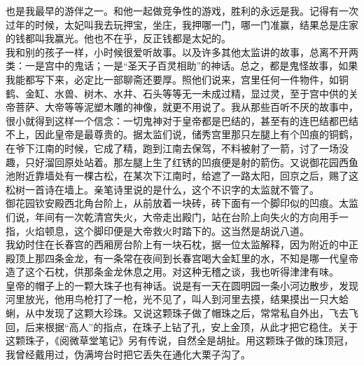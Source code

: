也是我最早的游伴之一。和他一起做竞争性的游戏，胜利的永远是我。记得有一次过年的时候，太妃叫我去玩押宝，坐庄，我押哪一门，哪一门准赢，结果总是庄家的钱都叫我赢光。他也不在乎，反正钱都是太妃的。\\

我和别的孩子一样，小时候很爱听故事。以及许多其他太监讲的故事，总离不开两类：一是宫中的鬼话；一是“圣天子百灵相助”的神话。总之，都是鬼怪故事，如果我能都写下来，必定比一部聊斋还要厚。照他们说来，宫里任何一件物件，如铜鹤、金缸、水兽、树木、水井、石头等等无一未成过精，显过灵，至于宫中供的关帝菩萨、大帝等等泥塑木雕的神像，就更不用说了。我从那些百听不厌的故事中，很小就得到这样一个信念：一切鬼神对于皇帝都是巴结的，甚至有的连巴结都巴结不上，因此皇帝是最尊贵的。据太监们说，储秀宫里那只左腿上有个凹痕的铜鹤，在爷下江南的时候，它成了精，跑到江南去保驾，不料被射了一箭，讨了一场没趣，只好溜回原处站着。那左腿上生了红锈的凹痕便是射的箭伤。又说御花园西鱼池附近靠墙处有一棵古松，在某次下江南时，给遮了一路太阳，回京之后，赐了这松树一首诗在墙上。亲笔诗里说的是什么，这个不识字的太监就不管了。\\

御花园钦安殿西北角台阶上，从前放着一块砖，砖下面有一个脚印似的凹痕。太监们说，年间有一次乾清宫失火，大帝走出殿门，站在台阶上向失火的方向用手一指，火焰顿息，这个脚印便是大帝救火时踏下的。这当然是胡说八道。\\

我幼时住在长春宫的西厢房台阶上有一块石枕，据一位太监解释，因为附近的中正殿顶上那四条金龙，有一条常在夜间到长春宫喝大金缸里的水，不知是哪一代皇帝造了这个石枕，供那条金龙休息之用。对这种无稽之谈，我也听得津津有味。\\

皇帝的帽子上的一颗大珠子也有神话。说是有一天在圆明园一条小河边散步，发现河里放光，他用鸟枪打了一枪，光不见了，叫人到河里去摸，结果摸出一只大蛤蜊，从中发现了这颗大珍珠。又说这颗珠子做了帽珠之后，常常私自外出，飞去飞回，后来根据“高人”的指点，在珠子上钻了孔，安上金顶，从此才把它稳住。关于这颗珠子，《阅微草堂笔记》另有传说，自然全是胡扯。用这颗珠子做的珠顶冠，我曾经戴用过，伪满垮台时把它丢失在通化大栗子沟了。\\

